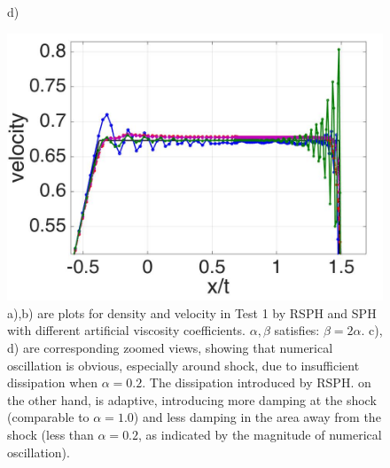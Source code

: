 \documentclass[review]{elsarticle}
\begin{document}
\begin{figure}[H]
\begin{minipage}{.45 \textwidth}
    \end{minipage}%
    \begin{minipage}{.545\textwidth}
    \centering d)
        \begin{flushleft}
        \includegraphics[width= 0.8174 \textwidth, height=0.5780 \textwidth]{./Figures/RCM-Sod-SPH-alf-v-zoom}    
        \end{flushleft}
    \end{minipage}%
    \caption{a),b) are plots for density and velocity in Test 1 by RSPH and SPH with different artificial viscosity coefficients. $\alpha,\beta$ satisfies: $\beta=2\alpha$.  c), d) are corresponding zoomed views, showing that numerical oscillation is obvious, especially around shock, due to insufficient dissipation when $\alpha=0.2$. The dissipation introduced by RSPH. on the other hand, is adaptive, introducing more damping at the shock (comparable to $\alpha=1.0$) and less damping in the area away from the shock (less than $\alpha=0.2$, as indicated by the magnitude of numerical oscillation).}
    \label{fig:RCM-Sod-SPH-alf}
\end{figure}
\end{document}
